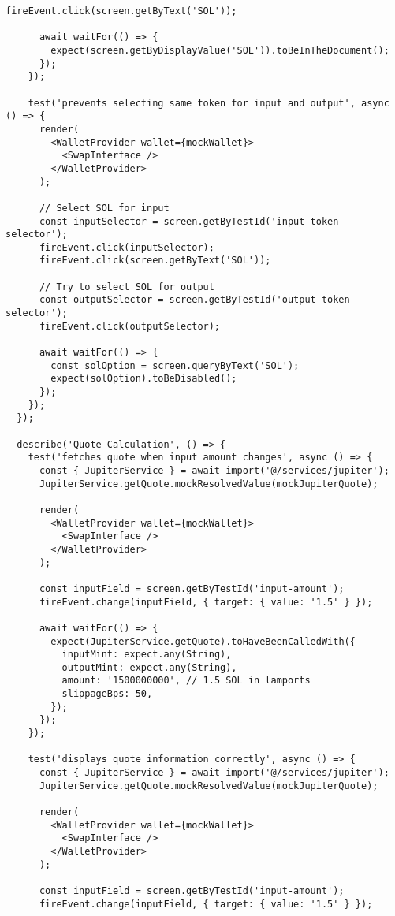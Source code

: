\documentclass[11pt,a4paper]{article}
\begin{document}
\begin{lstlisting}[style=typescript, caption=React Component Unit Tests]
      fireEvent.click(screen.getByText('SOL'));

      await waitFor(() => {
        expect(screen.getByDisplayValue('SOL')).toBeInTheDocument();
      });
    });

    test('prevents selecting same token for input and output', async () => {
      render(
        <WalletProvider wallet={mockWallet}>
          <SwapInterface />
        </WalletProvider>
      );

      // Select SOL for input
      const inputSelector = screen.getByTestId('input-token-selector');
      fireEvent.click(inputSelector);
      fireEvent.click(screen.getByText('SOL'));

      // Try to select SOL for output
      const outputSelector = screen.getByTestId('output-token-selector');
      fireEvent.click(outputSelector);

      await waitFor(() => {
        const solOption = screen.queryByText('SOL');
        expect(solOption).toBeDisabled();
      });
    });
  });

  describe('Quote Calculation', () => {
    test('fetches quote when input amount changes', async () => {
      const { JupiterService } = await import('@/services/jupiter');
      JupiterService.getQuote.mockResolvedValue(mockJupiterQuote);

      render(
        <WalletProvider wallet={mockWallet}>
          <SwapInterface />
        </WalletProvider>
      );

      const inputField = screen.getByTestId('input-amount');
      fireEvent.change(inputField, { target: { value: '1.5' } });

      await waitFor(() => {
        expect(JupiterService.getQuote).toHaveBeenCalledWith({
          inputMint: expect.any(String),
          outputMint: expect.any(String),
          amount: '1500000000', // 1.5 SOL in lamports
          slippageBps: 50,
        });
      });
    });

    test('displays quote information correctly', async () => {
      const { JupiterService } = await import('@/services/jupiter');
      JupiterService.getQuote.mockResolvedValue(mockJupiterQuote);

      render(
        <WalletProvider wallet={mockWallet}>
          <SwapInterface />
        </WalletProvider>
      );

      const inputField = screen.getByTestId('input-amount');
      fireEvent.change(inputField, { target: { value: '1.5' } });


\end{lstlisting}
\end{document}
